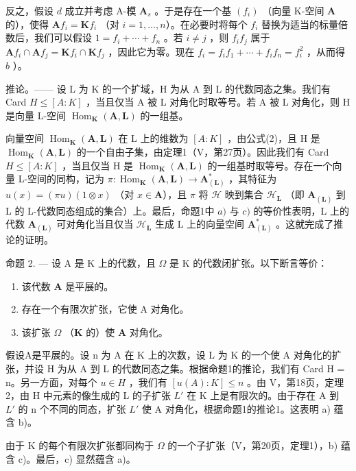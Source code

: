 反之，假设 \(d\) 成立并考虑 A-模 \(\mathbf{A}_{s}\) 。于是存在一个基 \((f_{i})\) （向量 K-空间 \(\mathbf{A}\) 的），使得 \(\mathbf{A}f_{i} = \mathbf{K}f_{i}\) （对 \(i = 1, \ldots, n\)）。在必要时将每个 \(f_{i}\) 替换为适当的标量倍数后，我们可以假设 \(1 = f_{i} + \cdots + f_{n}\) 。若 \(i \neq j\) ，则 \(f_{i}f_{j}\) 属于 \(\mathbf{A}f_{i} \cap \mathbf{A}f_{j} = \mathbf{K}f_{i} \cap \mathbf{K}f_{j}\) ，因此它为零。现在 \(f_{i} = f_{i}f_{1} + \cdots + f_{i}f_{n} = f_{i}^{2}\) ，从而得 \(b\) ）。

推论。—— 设 L 为 K 的一个扩域，H 为从 A 到 L 的代数同态之集。我们有 Card \(H \leq [A:K]\) ，当且仅当 A 被 L 对角化时取等号。若 A 被 L 对角化，则 H 是向量 L-空间 \(\operatorname{Hom}_{\mathbf{K}}(\mathbf{A},\mathbf{L})\) 的一组基。

向量空间 \(\operatorname{Hom}_{\mathbf{K}}(\mathbf{A},\mathbf{L})\) 在 L 上的维数为 \([A:K]\) ，由公式(2)，且 H 是 \(\operatorname{Hom}_{\mathbf{K}}(\mathbf{A},\mathbf{L})\) 的一个自由子集，由定理1（V，第27页）。因此我们有 Card \(H \leqslant [A:K]\) ，当且仅当 H 是 \(\operatorname{Hom}_{\mathbf{K}}(\mathbf{A},\mathbf{L})\) 的一组基时取等号。存在一个向量 L-空间的同构，记为 \(\pi: \operatorname{Hom}_{\mathbf{K}}(\mathbf{A}, \mathbf{L}) \to \mathbf{A}_{(\mathbf{L})}^{*}\) ，其特征为 \(u(x) = (\pi u)(1 \otimes x)\) （对 \(x \in \mathbf{A}\)），且 \(\pi\) 将 \(\mathcal{H}\) 映到集合 \(\mathcal{H}_{\mathbf{L}}\) （即 \(\mathbf{A}_{(\mathbf{L})}\) 到 L 的 L-代数同态组成的集合）上。最后，命题1中 \(a)\) 与 \(c)\) 的等价性表明，L 上的代数 \(\mathbf{A}_{(\mathbf{L})}\) 可对角化当且仅当 \(\mathcal{H}_{\mathbf{L}}\) 生成 L 上的向量空间 \(\mathbf{A}_{(\mathbf{L})}^{*}\) 。这就完成了推论的证明。

命题 2. --- 设 A 是 K 上的代数，且 \(\Omega\) 是 K 的代数闭扩张。以下断言等价：

\begin{enumerate}
\def\labelenumi{\alph{enumi})}
\item
  该代数 \(\mathbf{A}\) 是平展的。
\item
  存在一个有限次扩张，它使 A 对角化。
\item
  该扩张 \(\Omega\) （\(\mathbf{K}\) 的）使 \(\mathbf{A}\) 对角化。
\end{enumerate}

假设A是平展的。设 n 为 A 在 K 上的次数，设 L 为 K 的一个使 A 对角化的扩张，并设 H 为从 A 到 L 的代数同态之集。根据命题1的推论，我们有 Card H = n。另一方面，对每个 \(u \in H\) ，我们有 \([u(A):K] \leqslant n\) 。由 V，第18页，定理2，由 H 中元素的像生成的 L 的子扩张 \(L'\) 在 K 上是有限次的。由于存在 A 到 \(L'\) 的 n 个不同的同态，扩张 \(L'\) 使 A 对角化，根据命题1的推论1。这表明 a) 蕴含 b)。

由于 K 的每个有限次扩张都同构于 \(\Omega\) 的一个子扩张（V，第20页，定理1），b) 蕴含 c)。最后，c) 显然蕴含 a)。

